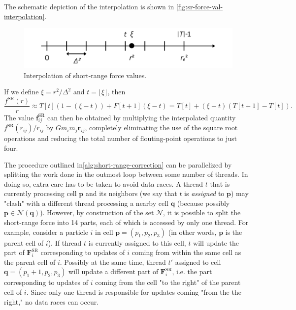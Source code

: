 The schematic depiction of the interpolation is shown in \autoref{fig:sr-force-val-interpolation}.
\begin{figure}[htp]
    \centering
    \includegraphics[scale=0.2]{img/interpolation.png}
    \caption{Interpolation of short-range force values.}
    \label{fig:sr-force-val-interpolation}
\end{figure}
If we define $\xi = r^2 / \Delta^2$ and $t=\lfloor \xi \rfloor$, then
\begin{equation*}
    \frac{f^\text{SR}(r)}{r} \approx T[t](1 - (\xi - t)) + F[t+1](\xi - t)
    = T[t] + (\xi - t) (T[t+1] - T[t]).
\end{equation*}
The value $\mathbf{f}^\text{SR}_{ij}$ can then be obtained by multiplying the interpolated quantity $f^\text{SR}(r_{ij})/r_{ij}$ by $G m_i m_j \mathbf{r}_{ij}$, completely eliminating the use of the square root operations and reducing the total number of flouting-point operations to just four.

The procedure outlined in\autoref{alg:short-range-correction} can be parallelized by splitting the work done in the outmost loop between some number of threads.
In doing so, extra care has to be taken to avoid data races.
A thread $t$ that is currently processing cell $\mathbf{p}$ and its neighbors (we say that $t$ is \textit{assigned} to $\mathbf{p}$) may "clash" with a different thread processing a nearby cell $\mathbf{q}$ (because possibly $\mathbf{p} \in \mathcal{N}(\mathbf{q})$).
However, by construction of the set $\mathcal{N}$, it is possible to split the short-range force into 14 parts, each of which is accessed by only one thread.
For example, consider a particle $i$ in cell $\mathbf{p} = (p_1, p_2, p_3)$ (in other words, $\mathbf{p}$ is the parent cell of $i$).
If thread $t$ is currently assigned to this cell, $t$ will update the part of $\mathbf{F}^\text{SR}_i$ corresponding to updates of $i$ coming from within the same cell as the parent cell of $i$.
Possibly at the same time, thread $t'$ assigned to cell $\mathbf{q} = (p_1+1, p_2, p_3)$ will update a different part of $\mathbf{F}^\text{SR}_i$, i.e. the part corresponding to updates of $i$ coming from the cell "to the right" of the parent cell of $i$.
Since only one thread is responsible for updates coming "from the the right," no data races can occur.